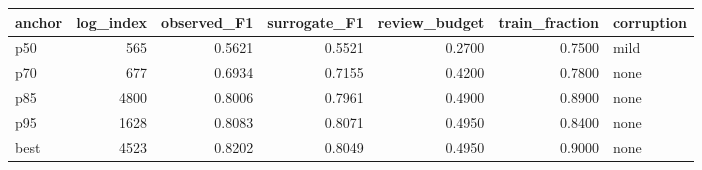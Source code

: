 \begin{tabular}{lrrrrrl}
\toprule
anchor &  log\_index &  observed\_F1 &  surrogate\_F1 &  review\_budget &  train\_fraction & corruption \\
\midrule
   p50 &        565 &       0.5621 &        0.5521 &         0.2700 &          0.7500 &       mild \\
   p70 &        677 &       0.6934 &        0.7155 &         0.4200 &          0.7800 &       none \\
   p85 &       4800 &       0.8006 &        0.7961 &         0.4900 &          0.8900 &       none \\
   p95 &       1628 &       0.8083 &        0.8071 &         0.4950 &          0.8400 &       none \\
  best &       4523 &       0.8202 &        0.8049 &         0.4950 &          0.9000 &       none \\
\bottomrule
\end{tabular}
